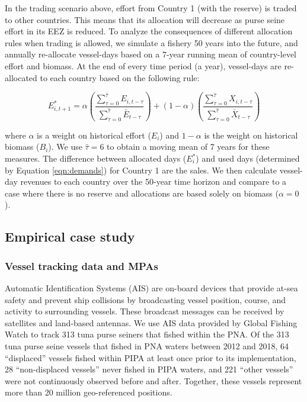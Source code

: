 \documentclass[12pt]{article}
\begin{document}
In the trading scenario above, effort from Country 1 (with the reserve) is traded to other countries. This means that its allocation will decrease as purse seine effort in its EEZ is reduced. To analyze the consequences of different allocation rules when trading is allowed, we simulate a fishery 50 years into the future, and annually re-allocate vessel-days based on a 7-year running mean of country-level effort and biomass. At the end of every time period (a year), vessel-days are re-allocated to each country based on the following rule:

$$
E_{i,t+1}^* = \alpha
\left(\frac{\sum_{\tau = 0}^{\hat{\tau}}E_{i,t-\tau}}{\sum_{\tau = 0}^{\hat{\tau}}\bar{E}_{{t-\tau}}}
	\right)
	+
(1 - \alpha)
\left(\frac{\sum_{\tau = 0}^{\hat{\tau}}X_{i,t-\tau}}{\sum_{\tau = 0}^{\hat{\tau}}\bar{X}_{t-\tau}} \right)
$$

\noindent where $\alpha$ is a weight on historical effort ($E_i$) and $1-\alpha$ is the weight on historical biomass ($B_i$). We use $\hat{\tau}= 6$ to obtain a moving mean of 7 years for these measures. The difference between allocated days ($E_i^*$) and used days (determined by Equation \ref{eqn:demands}) for Country 1 are the sales. We then calculate vessel-day revenues to each country over the 50-year time horizon and compare to a case where there is no reserve and allocations are based solely on biomass ($\alpha = 0$).

\subsection{Empirical case study}

\subsubsection{Vessel tracking data and MPAs}

Automatic Identification Systems (AIS) are on-board devices that provide at-sea safety and prevent ship collisions by broadcasting vessel position, course, and activity to surrounding vessels. These broadcast messages can be received by satellites and land-based antennas. We use AIS data provided by Global Fishing Watch \cite{kroodsma_2018} to track 313 tuna purse seiners that fished within the PNA. Of the 313 tuna purse seine vessels that fished in PNA waters between 2012 and 2018, 64 ``displaced'' vessels fished within PIPA at least once prior to its implementation, 28 ``non-displaced vessels'' never fished in PIPA waters, and  221 ``other vessels'' were not continuously observed before and after. Together, these vessels represent more than 20 million geo-referenced positions.
\end{document}
